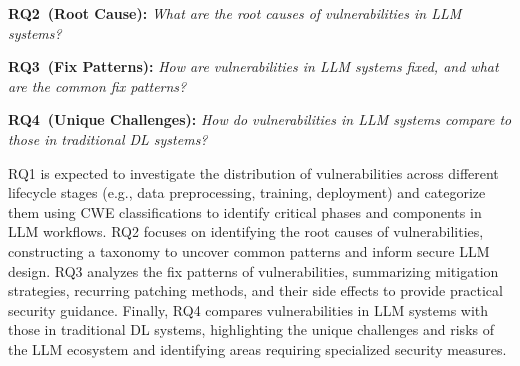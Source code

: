 \textbf{RQ2~(Root Cause):} \textit{What are the root causes of vulnerabilities in LLM systems?} 

\textbf{RQ3~(Fix Patterns):} \textit{How are vulnerabilities in LLM systems fixed, and what are the common fix patterns?} 

\textbf{RQ4~(Unique Challenges):} \textit{How do vulnerabilities in LLM systems compare to those in traditional DL systems?}

RQ1 is expected to investigate the distribution of vulnerabilities across different lifecycle stages (e.g., data preprocessing, training, deployment) and categorize them using CWE classifications to identify critical phases and components in LLM workflows. RQ2 focuses on identifying the root causes of vulnerabilities, constructing a taxonomy to uncover common patterns and inform secure LLM design. RQ3 analyzes the fix patterns of vulnerabilities, summarizing mitigation strategies, recurring patching methods, and their side effects to provide practical security guidance. Finally, RQ4 compares vulnerabilities in LLM systems with those in traditional DL systems, highlighting the unique challenges and risks of the LLM ecosystem and identifying areas requiring specialized security measures.
